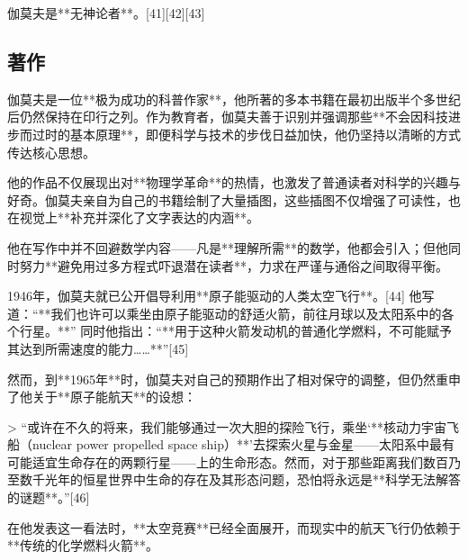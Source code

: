 伽莫夫是**无神论者**。[41][42][43]
\subsection{著作}
伽莫夫是一位**极为成功的科普作家**，他所著的多本书籍在最初出版半个多世纪后仍然保持在印行之列。作为教育者，伽莫夫善于识别并强调那些**不会因科技进步而过时的基本原理**，即便科学与技术的步伐日益加快，他仍坚持以清晰的方式传达核心思想。

他的作品不仅展现出对**物理学革命**的热情，也激发了普通读者对科学的兴趣与好奇。伽莫夫亲自为自己的书籍绘制了大量插图，这些插图不仅增强了可读性，也在视觉上**补充并深化了文字表达的内涵**。

他在写作中并不回避数学内容——凡是**理解所需**的数学，他都会引入；但他同时努力**避免用过多方程式吓退潜在读者**，力求在严谨与通俗之间取得平衡。

1946年，伽莫夫就已公开倡导利用**原子能驱动的人类太空飞行**。[44]
他写道：“**我们也许可以乘坐由原子能驱动的舒适火箭，前往月球以及太阳系中的各个行星。**”
同时他指出：“**用于这种火箭发动机的普通化学燃料，不可能赋予其达到所需速度的能力……**”[45]

然而，到**1965年**时，伽莫夫对自己的预期作出了相对保守的调整，但仍然重申了他关于**原子能航天**的设想：

> “或许在不久的将来，我们能够通过一次大胆的探险飞行，乘坐‘**核动力宇宙飞船（nuclear power propelled space ship）**’去探索火星与金星——太阳系中最有可能适宜生命存在的两颗行星——上的生命形态。然而，对于那些距离我们数百乃至数千光年的恒星世界中生命的存在及其形态问题，恐怕将永远是**科学无法解答的谜题**。”[46]

在他发表这一看法时，**太空竞赛**已经全面展开，而现实中的航天飞行仍依赖于**传统的化学燃料火箭**。
